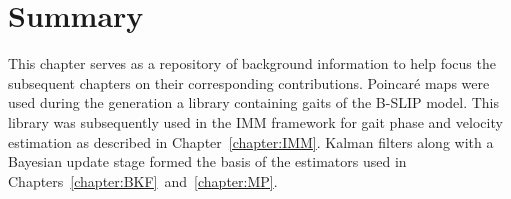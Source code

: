\section{Summary}
This chapter serves as a repository of background information to help focus the subsequent chapters on their corresponding contributions. Poincar\'e maps were used during the generation a library containing gaits of the B-SLIP model. This library was subsequently used in the IMM framework for gait phase and velocity estimation as described in Chapter~\ref{chapter:IMM}. Kalman filters along with a Bayesian update stage formed the basis of the estimators used in Chapters~\ref{chapter:BKF}~and~\ref{chapter:MP}.
